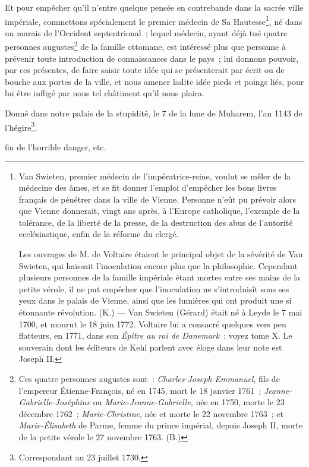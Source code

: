 \documentclass[french,twoside]{book} %
\begin{document}
Et pour empêcher qu’il n’entre quelque pensée en contrebande dans la sacrée ville impériale, commettons spécialement le premier médecin de Sa Hautesse\footnote{ \noindent Van Swieten, premier médecin de l’impératrice-reine, voulut se mêler de la médecine des âmes, et se fit donner l’emploi d’empêcher les bons livres français de pénétrer dans la ville de Vienne. Personne n’eût pu prévoir alors que Vienne donnerait, vingt ans après, à l’Europe catholique, l’exemple de la tolérance, de la liberté de la presse, de la destruction des abus de l’autorité ecclésiastique, enfin de la réforme du clergé.\par
 Les ouvrages de M. de Voltaire étaient le principal objet de la sévérité de Van Swieten, qui haïssait l’inoculation encore plus que la philosophie. Cependant plusieurs personnes de la famille impériale étant mortes entre ses mains de la petite vérole, il ne put empêcher que l’inoculation ne s’introduisît sous ses yeux dans le palais de Vienne, ainsi que les lumières qui ont produit une si étonnante révolution. (K.) — Van Swieten (Gérard) était né à Leyde le 7 mai 1700, et mourut le 18 juin 1772. Voltaire lui a consacré quelques vers peu flatteurs, en 1771, dans son \emph{Épître au roi de Danemark} : voyez tome X. Le souverain dont les éditeurs de Kehl parlent avec éloge dans leur note est Joseph II.
}, né dans un marais de l’Occident septentrional ; lequel médecin, ayant déjà tué quatre personnes augustes\footnote{Ces quatre personnes augustes sont : \emph{Charles-Joseph-Emmanuel}, fils de l’empereur Étienne-François, né en 1745, mort le 18 janvier 1761 ; \emph{Jeanne-Gabrielle-Joséphine} ou \emph{Marie-Jeanne-Gabrielle}, née en 1750, morte le 23 décembre 1762 ; \emph{Marie-Christine}, née et morte le 22 novembre 1763 ; et \emph{Marie-Élisabeth} de Parme, femme du prince impérial, depuis Joseph II, morte de la petite vérole le 27 novembre 1763. (B.)} de la famille ottomane, est intéressé plus que personne à prévenir toute introduction de connaissances dans le pays ; lui donnons pouvoir, par ces présentes, de faire saisir toute idée qui se présenterait par écrit ou de bouche aux portes de la ville, et nous amener ladite idée pieds et poings liés, pour lui être infligé par nous tel châtiment qu’il nous plaira.\par
Donné dans notre palais de la stupidité, le 7 de la lune de Muharem, l’an 1143 de l’hégire\footnote{Correspondant au 23 juillet 1730.}.\par

\begin{center}
fin de l’horrible danger, etc.\end{center}
 
\end{document}
